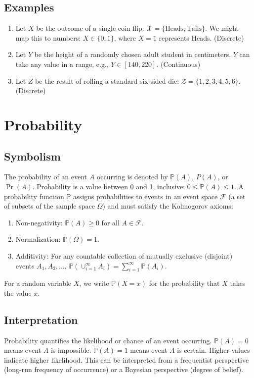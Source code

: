 \documentclass{article}
\newcommand{\Prob}{\mathbb{P}} %
\begin{document}
\subsection*{Examples}
\begin{enumerate}
    \item Let $X$ be the outcome of a single coin flip: $\mathcal{X} = \{ \text{Heads}, \text{Tails} \}$. We might map this to numbers: $X \in \{0, 1\}$, where $X=1$ represents Heads. (Discrete)
    \item Let $Y$ be the height of a randomly chosen adult student in centimeters. $Y$ can take any value in a range, e.g., $Y \in [140, 220]$. (Continuous)
    \item Let $Z$ be the result of rolling a standard six-sided die: $\mathcal{Z} = \{1, 2, 3, 4, 5, 6\}$. (Discrete)
\end{enumerate}

\section{Probability}

\subsection*{Symbolism}
The probability of an event $A$ occurring is denoted by $\Prob(A)$, $P(A)$, or $\Pr(A)$. Probability is a value between 0 and 1, inclusive: $0 \le \Prob(A) \le 1$.
A probability function $\Prob$ assigns probabilities to events in an event space $\mathcal{F}$ (a set of subsets of the sample space $\Omega$) and must satisfy the Kolmogorov axioms:
\begin{enumerate}
    \item Non-negativity: $\Prob(A) \ge 0$ for all $A \in \mathcal{F}$.
    \item Normalization: $\Prob(\Omega) = 1$.
    \item Additivity: For any countable collection of mutually exclusive (disjoint) events $A_1, A_2, \dots$, $\Prob(\cup_{i=1}^\infty A_i) = \sum_{i=1}^\infty \Prob(A_i)$.
\end{enumerate}
For a random variable $X$, we write $\Prob(X=x)$ for the probability that $X$ takes the value $x$.

\subsection*{Interpretation}
Probability quantifies the likelihood or chance of an event occurring. $\Prob(A)=0$ means event $A$ is impossible. $\Prob(A)=1$ means event $A$ is certain. Higher values indicate higher likelihood. This can be interpreted from a frequentist perspective (long-run frequency of occurrence) or a Bayesian perspective (degree of belief).
\end{document}
